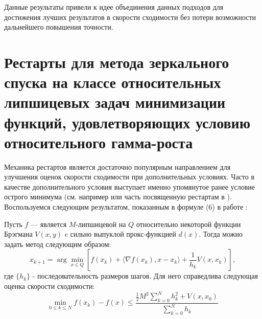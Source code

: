     Данные результаты привели к идее объединения данных подходов для достижения лучших результатов в скорости сходимости без потери возможности дальнейшего повышения точности.

\section{Рестарты для метода зеркального спуска на классе относительных липшицевых задач минимизации функций, удовлетворяющих условию относительного гамма-роста}\label{sec:ch3/sect3}
    Механика рестартов является достаточно популярным направлением для улучшения оценок скорости сходимости при дополнительных условиях. Часто в качестве дополнительного условия выступает именно упомянутое ранее условие острого минимума (см. например \cite{sharp_rest} или часть посвященную рестартам в \cite{sharp22}).
    Воспользуемся следующим результатом, показанным в формуле (6) в работе \cite{Lu_2018}:
    \begin{theorem} \label{vanilla_mirror}
        Пусть $f$ --- является $M$-липшицевой на $Q$ относительно некоторой функции Брэгмана $V(x, y)$ c сильно выпуклой прокс-функцией $d(x)$. Тогда можно задать метод следующим образом:
        \begin{equation} \label{mirr_upd}
            x_{k+1} = \arg \min_{x \in Q} {\left[ f(x_k) + \langle \nabla f(x_k), x - x_k \rangle + \frac{1}{h_k} V(x, x_k)\right]},
        \end{equation}
        где $\{ h_k \}$ - последовательность размеров шагов.
        Для него справедлива следующая оценка скорости сходимости:
        \begin{equation} \label{general_est}
            \min_{0\leq k \leq N} f(x_k) - f(x) \leq \frac{\frac{1}{2} M^2 \sum_{k=0}^N h_k^2 + V(x, x_0)}{\sum_{k=0}^N h_k}
        \end{equation}
    \end{theorem}

